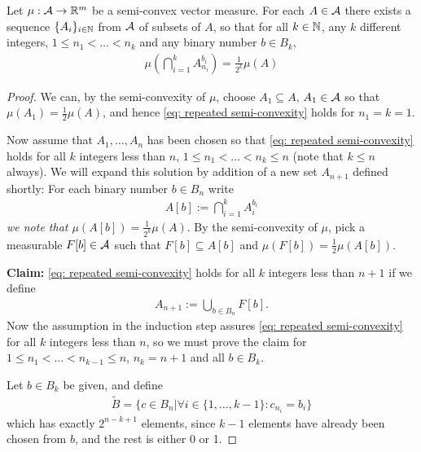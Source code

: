 \documentclass[../../main.tex]{subfiles}
\begin{document}
\begin{lemma} \label{sequence of sets with half the measure}
Let $\mu:\mathcal{A} \to \mathbb{R}^{m}$ be a semi-convex vector measure. For each $A\in \mathcal{A}$ there exists a sequence $\{A_{i}\}_{i\in \mathbb{N}}$ from $\mathcal{A}$ of subsets of $A$, so that for all $k\in \mathbb{N}$, any $k$ different integers, $1 \le n_{1} < \dots < n_{k}$ and any binary number $b\in B_{k}$,
\begin{align}
	\mu\left( \bigcap_{i=1}^{k} A_{n_{i}}^{b_{i}} \right) = \frac{1}{2^{k}} \mu(A) \label{eq: repeated semi-convexity}
\end{align}
\end{lemma}
\begin{proof}
 We can, by the semi-convexity of $\mu$, choose $A_{1}\subseteq A$, $A_{1}\in \mathcal{A}$ so that $\mu(A_{1})=\frac{1}{2}\mu(A)$, and hence \eqref{eq: repeated semi-convexity} holds for $n_{1}=k=1$.

Now assume that $A_{1}, \dots, A_{n}$ has been chosen so that \eqref{eq: repeated semi-convexity} holds for all $k$ integers less than $n$, $1\le n_{1} < \dots < n_{k}\le n$ (note that $k \le n$ always). We will expand this solution by addition of a new set $A_{n+1}$ defined shortly: For each binary number $b\in B_{n}$ write
\begin{align*}
	A[b] := \bigcap_{i=1}^{k} A_{i}^{b_{i}}
\end{align*}
\emph{we note that $\mu(A[b])=\frac{1}{2^{k}}\mu(A)$}.
By the semi-convexity of $\mu$, pick a measurable $F[b]\in \mathcal{A}$ such that $F[b] \subseteq A[b]$ and $\mu(F[b])=\frac{1}{2}\mu(A[b])$.

\textbf{Claim:} \eqref{eq: repeated semi-convexity} holds for all $k$ integers less than $n+1$ if we define
\begin{align}
	A_{n+1}:=\bigcup_{b\in B_{n}} F[b]. \label{eq: A n plus one}
\end{align}
Now the assumption in the induction step assures \eqref{eq: repeated semi-convexity} for all $k$ integers less than $n$, so we must prove the claim for $1\le n_{1} < \dots < n_{k-1} \le n$, $n_{k}=n+1$ and all $b\in B_{k}$.

Let $b\in B_{k}$ be given, and define
\begin{align*}
	\tilde{B}=\{c \in B_{n} | \forall i \in \{ 1, \dots, k-1 \} : c_{n_{i}} = b_{i}  \}
\end{align*}
which has exactly $2^{n-k+1}$ elements, since $k-1$ elements have already been chosen from $b$, and the rest is either 0 or 1.


\end{proof}
\end{document}
